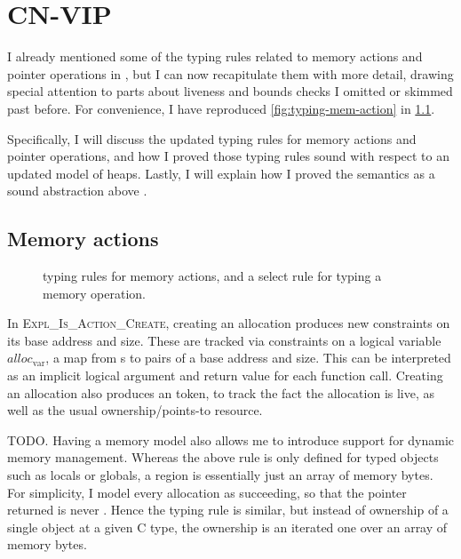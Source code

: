 \chapter{CN-VIP}\label{chap:cn-vip}

\margintoc{}

I already mentioned some of the typing rules related to memory actions and
pointer operations in , but I can now
recapitulate them with more detail, drawing special attention to parts about
liveness and bounds checks I omitted or skimmed past before. For convenience, I have
reproduced \cref{fig:typing-mem-action} in \cref{fig:cnvip-mem-action}.

Specifically, I will discuss the updated typing rules for memory actions and
pointer operations, and how I proved those typing rules sound with respect to
an updated model of  heaps. Lastly, I will explain how I proved the
 semantics as a sound abstraction above .

\section{Memory actions}

\begin{figure}[tp]
    \small
    \raggedright{}
    \onlyUseRules{\cndefnAction{}}{%
        \cndruleActionXXCreate{},
        \cndruleActionXXKillXXStatic{}
    }
    \onlyUseRules{\cndefnMemop{}}{%
        \cndruleMemopXXRelXXBinop{}
    }
    \caption{ typing rules for memory actions, and a select rule
        for typing a memory operation.}\label{fig:cnvip-mem-action}
\end{figure}

In \textsc{Expl\_Is\_Action\_Create}, creating an allocation produces new
constraints on its base address and size. These are tracked via constraints on a
logical variable $\mathit{alloc}_\mathrm{var}$, a map from s to
pairs of a base address and size. This can be interpreted as an implicit
logical argument and return value for each function call. Creating an
allocation also produces an  token, to track the fact the
allocation is live, as well as the usual ownership/points-to resource.

TODO\@. Having a memory model also allows me to introduce support for dynamic
memory management. Whereas the above rule is only defined for typed objects
such as locals or globals, a region is essentially just an array of memory
bytes. For simplicity, I model every allocation as succeeding, so that the
pointer returned is never . Hence the typing rule is similar,
but instead of ownership of a single object at a given C type, the ownership
is an iterated one over an array of memory bytes.

